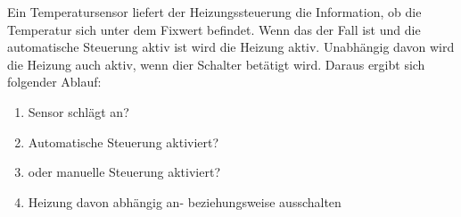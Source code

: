 Ein Temperatursensor liefert der Heizungssteuerung die Information, ob die Temperatur sich unter dem Fixwert befindet. Wenn das der Fall ist und die automatische Steuerung aktiv ist wird die Heizung aktiv. Unabhängig davon wird die Heizung auch aktiv, wenn dier Schalter betätigt wird. Daraus ergibt sich folgender Ablauf:

\begin{enumerate}
	\item {Sensor schlägt an?}
	\item {Automatische Steuerung aktiviert?}
	\item {oder manuelle Steuerung aktiviert?}
	\item {Heizung davon abhängig an- beziehungsweise ausschalten}
\end{enumerate}
